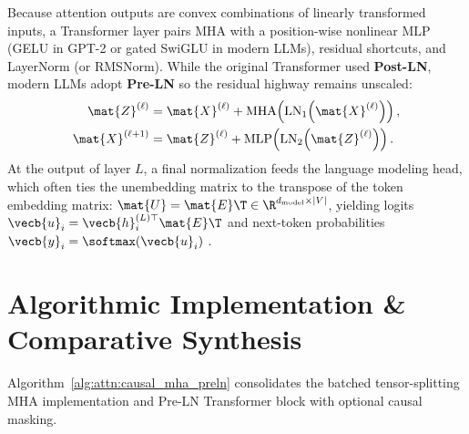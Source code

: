 \documentclass[../../../../master.tex]{subfiles}
\begin{document}
Because attention outputs are convex combinations of linearly transformed inputs, a Transformer layer pairs MHA with a position-wise nonlinear $\mathrm{MLP}$ (GELU in GPT-2  or gated SwiGLU in modern LLMs), residual shortcuts, and LayerNorm (or RMSNorm). While the original Transformer  used \textbf{Post-LN}, modern LLMs adopt \textbf{Pre-LN}   so the residual highway remains unscaled:
\begin{align}
  \mat{Z}^{(\ell)} &= \mat{X}^{(\ell)} + \mathrm{MHA}\!\left(\mathrm{LN}_1\!\left(\mat{X}^{(\ell)}\right)\right), \label{eq:attn:preln_1} \\
  \mat{X}^{(\ell+1)} &= \mat{Z}^{(\ell)} + \mathrm{MLP}\!\left(\mathrm{LN}_2\!\left(\mat{Z}^{(\ell)}\right)\right). \label{eq:attn:preln_2}
\end{align}
At the output of layer $L$, a final normalization feeds the language modeling head, which often ties the unembedding matrix to the transpose of the token embedding matrix: $\mat{U} = \mat{E}\T \in \R^{d_{\mathrm{model}} \times |V|}$, yielding logits $\vecb{u}_i = \vecb{h}_i^{(L)\top}\mat{E}\T$ and next-token probabilities $\vecb{y}_i = \softmax(\vecb{u}_i)$ .


\section{Algorithmic Implementation \& Comparative Synthesis}
\label{sec:attn:algorithms}

Algorithm~\ref{alg:attn:causal_mha_preln} consolidates the batched tensor-splitting MHA implementation  and Pre-LN Transformer block  with optional causal masking.
\end{document}
